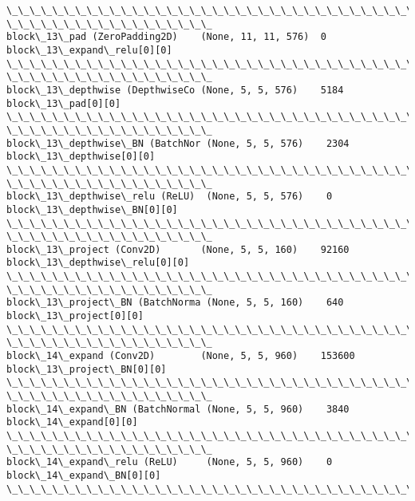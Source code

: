 \documentclass[11pt]{article}
\begin{document}
\begin{Verbatim}[commandchars=\\\{\}]
\_\_\_\_\_\_\_\_\_\_\_\_\_\_\_\_\_\_\_\_\_\_\_\_\_\_\_\_\_\_\_\_\_\_\_\_\_\_\_\_\_\_\_\_\_\_\_\_\_\_\_\_\_\_\_\_\_\_\_\_\_\_\_\_\_\_\_\_\_\_\_\_\_\_\_\_\_\_\_\_
\_\_\_\_\_\_\_\_\_\_\_\_\_\_\_\_\_\_
block\_13\_pad (ZeroPadding2D)    (None, 11, 11, 576)  0
block\_13\_expand\_relu[0][0]
\_\_\_\_\_\_\_\_\_\_\_\_\_\_\_\_\_\_\_\_\_\_\_\_\_\_\_\_\_\_\_\_\_\_\_\_\_\_\_\_\_\_\_\_\_\_\_\_\_\_\_\_\_\_\_\_\_\_\_\_\_\_\_\_\_\_\_\_\_\_\_\_\_\_\_\_\_\_\_\_
\_\_\_\_\_\_\_\_\_\_\_\_\_\_\_\_\_\_
block\_13\_depthwise (DepthwiseCo (None, 5, 5, 576)    5184
block\_13\_pad[0][0]
\_\_\_\_\_\_\_\_\_\_\_\_\_\_\_\_\_\_\_\_\_\_\_\_\_\_\_\_\_\_\_\_\_\_\_\_\_\_\_\_\_\_\_\_\_\_\_\_\_\_\_\_\_\_\_\_\_\_\_\_\_\_\_\_\_\_\_\_\_\_\_\_\_\_\_\_\_\_\_\_
\_\_\_\_\_\_\_\_\_\_\_\_\_\_\_\_\_\_
block\_13\_depthwise\_BN (BatchNor (None, 5, 5, 576)    2304
block\_13\_depthwise[0][0]
\_\_\_\_\_\_\_\_\_\_\_\_\_\_\_\_\_\_\_\_\_\_\_\_\_\_\_\_\_\_\_\_\_\_\_\_\_\_\_\_\_\_\_\_\_\_\_\_\_\_\_\_\_\_\_\_\_\_\_\_\_\_\_\_\_\_\_\_\_\_\_\_\_\_\_\_\_\_\_\_
\_\_\_\_\_\_\_\_\_\_\_\_\_\_\_\_\_\_
block\_13\_depthwise\_relu (ReLU)  (None, 5, 5, 576)    0
block\_13\_depthwise\_BN[0][0]
\_\_\_\_\_\_\_\_\_\_\_\_\_\_\_\_\_\_\_\_\_\_\_\_\_\_\_\_\_\_\_\_\_\_\_\_\_\_\_\_\_\_\_\_\_\_\_\_\_\_\_\_\_\_\_\_\_\_\_\_\_\_\_\_\_\_\_\_\_\_\_\_\_\_\_\_\_\_\_\_
\_\_\_\_\_\_\_\_\_\_\_\_\_\_\_\_\_\_
block\_13\_project (Conv2D)       (None, 5, 5, 160)    92160
block\_13\_depthwise\_relu[0][0]
\_\_\_\_\_\_\_\_\_\_\_\_\_\_\_\_\_\_\_\_\_\_\_\_\_\_\_\_\_\_\_\_\_\_\_\_\_\_\_\_\_\_\_\_\_\_\_\_\_\_\_\_\_\_\_\_\_\_\_\_\_\_\_\_\_\_\_\_\_\_\_\_\_\_\_\_\_\_\_\_
\_\_\_\_\_\_\_\_\_\_\_\_\_\_\_\_\_\_
block\_13\_project\_BN (BatchNorma (None, 5, 5, 160)    640
block\_13\_project[0][0]
\_\_\_\_\_\_\_\_\_\_\_\_\_\_\_\_\_\_\_\_\_\_\_\_\_\_\_\_\_\_\_\_\_\_\_\_\_\_\_\_\_\_\_\_\_\_\_\_\_\_\_\_\_\_\_\_\_\_\_\_\_\_\_\_\_\_\_\_\_\_\_\_\_\_\_\_\_\_\_\_
\_\_\_\_\_\_\_\_\_\_\_\_\_\_\_\_\_\_
block\_14\_expand (Conv2D)        (None, 5, 5, 960)    153600
block\_13\_project\_BN[0][0]
\_\_\_\_\_\_\_\_\_\_\_\_\_\_\_\_\_\_\_\_\_\_\_\_\_\_\_\_\_\_\_\_\_\_\_\_\_\_\_\_\_\_\_\_\_\_\_\_\_\_\_\_\_\_\_\_\_\_\_\_\_\_\_\_\_\_\_\_\_\_\_\_\_\_\_\_\_\_\_\_
\_\_\_\_\_\_\_\_\_\_\_\_\_\_\_\_\_\_
block\_14\_expand\_BN (BatchNormal (None, 5, 5, 960)    3840
block\_14\_expand[0][0]
\_\_\_\_\_\_\_\_\_\_\_\_\_\_\_\_\_\_\_\_\_\_\_\_\_\_\_\_\_\_\_\_\_\_\_\_\_\_\_\_\_\_\_\_\_\_\_\_\_\_\_\_\_\_\_\_\_\_\_\_\_\_\_\_\_\_\_\_\_\_\_\_\_\_\_\_\_\_\_\_
\_\_\_\_\_\_\_\_\_\_\_\_\_\_\_\_\_\_
block\_14\_expand\_relu (ReLU)     (None, 5, 5, 960)    0
block\_14\_expand\_BN[0][0]
\_\_\_\_\_\_\_\_\_\_\_\_\_\_\_\_\_\_\_\_\_\_\_\_\_\_\_\_\_\_\_\_\_\_\_\_\_\_\_\_\_\_\_\_\_\_\_\_\_\_\_\_\_\_\_\_\_\_\_\_\_\_\_\_\_\_\_\_\_\_\_\_\_\_\_\_\_\_\_\_

\end{Verbatim}
\end{document}
